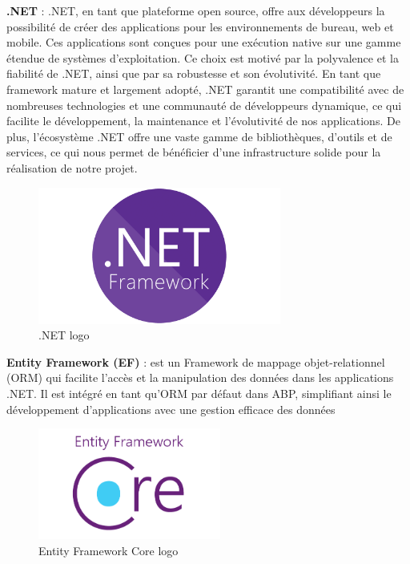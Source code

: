 \textbf{.NET} : .NET, en tant que plateforme open source, offre aux développeurs la possibilité de créer des applications pour les environnements de bureau, web et mobile. Ces applications sont conçues pour une exécution native sur une gamme étendue de systèmes d'exploitation. Ce choix est motivé par la polyvalence et la fiabilité de .NET, ainsi que par sa robustesse et son évolutivité. En tant que framework mature et largement adopté, .NET garantit une compatibilité avec de nombreuses technologies et une communauté de développeurs dynamique, ce qui facilite le développement, la maintenance et l'évolutivité de nos applications. De plus, l'écosystème .NET offre une vaste gamme de bibliothèques, d'outils et de services, ce qui nous permet de bénéficier d'une infrastructure solide pour la réalisation de notre projet.
\\
\begin{figure}[H]
    \centering
    \includegraphics[width=8cm]{Figures/dotnet.png}
    \caption{.NET logo}
\end{figure}




\textbf{Entity Framework (EF)} : est un Framework de mappage objet-relationnel (ORM) qui facilite l'accès et la manipulation des données dans les applications .NET. Il est intégré en tant qu'ORM par défaut dans ABP, simplifiant ainsi le développement d'applications avec une gestion efficace des données
\\
\begin{figure}[H]
    \centering
    \includegraphics[width=6cm]{Figures/efcore.png}
    \caption{Entity Framework Core logo}
\end{figure}


